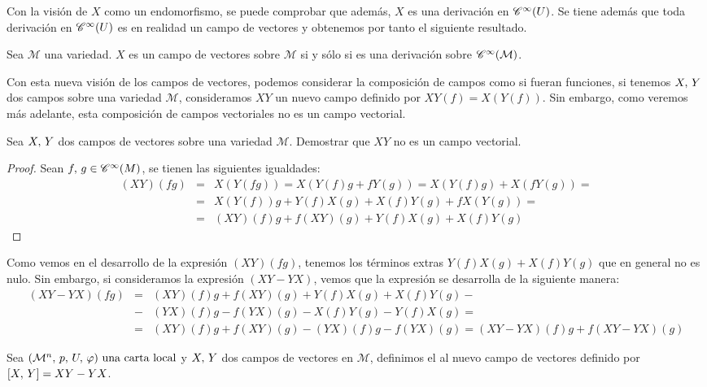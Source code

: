 Con la visión de $X$ como un endomorfismo, se puede comprobar que además, $X$ es una derivación en $\mathscr{C}^\infty(U)$.
Se tiene además que toda derivación en $\mathscr{C}^\infty(U)$ es en realidad un campo de vectores y obtenemos por tanto el
siguiente resultado.

\begin{result}
	\label{pro:campo-vectores-derivacion}
	Sea $\mathcal{M}$ una variedad. $X$ es un campo de vectores sobre $\mathcal{M}$ si y sólo si es una derivación
	sobre $\mathscr{C}^\infty(\mathcal{M})$.
\end{result}

Con esta nueva visión de los campos de vectores, podemos considerar la composición de campos como si fueran funciones,
si tenemos $X,\thinspace Y$ dos campos sobre una variedad $\mathcal{M}$, consideramos $XY$ un nuevo campo definido por $XY
(f)=X(Y(f))$.
Sin embargo, como veremos más adelante, esta composición de campos vectoriales no es un campo vectorial.

\begin{exercise}
	Sea $X,\thinspace Y$ dos campos de vectores sobre una variedad $\mathcal{M}$. Demostrar que $XY$ no es un campo vectorial.
\end{exercise}
\begin{proof}
	Sean $f,\thinspace g\in\mathscr{C}^\infty(M)$, se tienen las siguientes igualdades:
	\begin{eqnarray*}
		(XY)(fg) & = & X(Y(fg)) = X(Y(f)g+fY(g)) = X(Y(f)g)+X(fY(g))=\\
		& = & X(Y(f))g+Y(f)X(g)+X(f)Y(g)+fX(Y(g)) = \\
		& = & (XY)(f)g+f(XY)(g)+Y(f)X(g)+X(f)Y(g)
	\end{eqnarray*}
\end{proof}

Como vemos en el desarrollo de la expresión $(XY)(fg)$, tenemos los términos extras $Y(f)X(g)+X(f)Y(g)$ que en
general no es nulo.
Sin embargo, si consideramos la expresión $(XY-YX)$, vemos que la expresión se desarrolla de la siguiente manera:
\begin{eqnarray*}
	(XY-YX)(fg) & = & (XY)(f)g+f(XY)(g)+Y(f)X(g)+X(f)Y(g) - \\
	& - & (YX)(f)g-f(YX)(g)-X(f)Y(g)-Y(f)X(g) = \\
	& = & (XY)(f)g+f(XY)(g) - (YX)(f)g-f(YX)(g) = (XY-YX)(f)g+ f(XY-YX)(g)
\end{eqnarray*}


\begin{definition}
	Sea $(\mathcal{M}^n,\thinspace p,\thinspace U,\thinspace \varphi)\textmd{ una carta local}$ y $X,\thinspace Y$ dos campos de vectores en $\mathcal{M}$, definimos el  al nuevo campo de vectores definido por $[X,\thinspace Y]=XY-YX$.
\end{definition}

